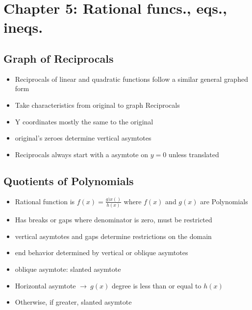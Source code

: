 \documentclass{article}
\newcommand{\rt}{$\to\ $}
\begin{document}
    \section{Chapter 5: Rational funcs., eqs., ineqs.}
    
    \subsection{Graph of Reciprocals}
    \begin{itemize}
        \item Reciprocals of linear and quadratic functions follow a similar general graphed form 
        \item Take characteristics from original to graph Reciprocals
        \item Y coordinates mostly the same to the original
        \item original's zeroes determine vertical asymtotes
        \item Reciprocals always start with a asymtote on $y=0$ unless translated
    \end{itemize}

    \subsection{Quotients of Polynomials}
    \begin{itemize}
        \item Rational function is $f(x) = \frac{g)x()}{h(x)}$ where $f(x)$ and $g(x)$ are Polynomials
        \item Has breaks or gaps where denominator is zero, must be restricted
        \item vertical asymtotes and gaps determine restrictions on the domain
        \item end behavior determined by vertical or oblique asymtotes
        \item oblique asymtote: slanted asymtote
        \item Horizontal asymtote \rt $g(x)$ degree is less than or equal to $h(x)$
        \item Otherwise, if greater, slanted asymtote
    \end{itemize}
\end{document}
